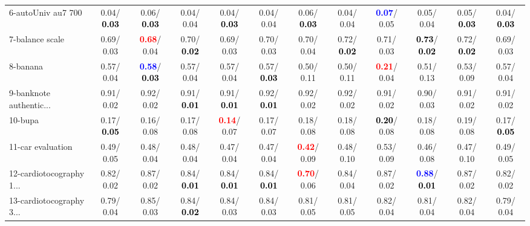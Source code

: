 \begin{table}[h]
\begin{center}
{\begin{tabular}{lc|c|c|c|c|c|c|c|c|c|c}
6-autoUniv au7 700 &   0.04/\textcolor{black}{\textbf{  0.03}} &   0.06/\textcolor{black}{\textbf{  0.03}} &   0.04/  0.04 &   0.04/\textcolor{black}{\textbf{  0.03}} &   0.04/  0.04 &   0.06/\textcolor{black}{\textbf{  0.03}} &   0.04/  0.04 & \textcolor{blue}{\textbf{  0.07}}/  0.05 &   0.05/  0.04 &   0.05/\textcolor{black}{\textbf{  0.03}} &   0.04/\textcolor{black}{\textbf{  0.03}} \\
7-balance scale &   0.69/  0.03 & \textcolor{red}{\textbf{  0.68}}/  0.04 &   0.70/\textcolor{black}{\textbf{  0.02}} &   0.69/  0.03 &   0.70/  0.03 &   0.70/  0.04 &   0.72/\textcolor{black}{\textbf{  0.02}} &   0.71/  0.03 & \textcolor{black}{\textbf{  0.73}}/\textcolor{black}{\textbf{  0.02}} &   0.72/\textcolor{black}{\textbf{  0.02}} &   0.69/  0.03 \\ \hline
8-banana &   0.57/  0.04 & \textcolor{blue}{\textbf{  0.58}}/\textcolor{black}{\textbf{  0.03}} &   0.57/  0.04 &   0.57/  0.04 &   0.57/\textcolor{black}{\textbf{  0.03}} &   0.50/  0.11 &   0.50/  0.11 & \textcolor{red}{\textbf{  0.21}}/  0.04 &   0.51/  0.13 &   0.53/  0.09 &   0.57/  0.04 \\
9-banknote authentic... &   0.91/  0.02 &   0.92/  0.02 &   0.91/\textcolor{black}{\textbf{  0.01}} &   0.91/\textcolor{black}{\textbf{  0.01}} &   0.92/\textcolor{black}{\textbf{  0.01}} &   0.92/  0.02 &   0.92/  0.02 &   0.91/  0.02 &   0.90/  0.03 &   0.91/  0.02 &   0.91/  0.02 \\
10-bupa &   0.17/\textcolor{black}{\textbf{  0.05}} &   0.16/  0.08 &   0.17/  0.08 & \textcolor{red}{\textbf{  0.14}}/  0.07 &   0.17/  0.07 &   0.18/  0.08 &   0.18/  0.08 & \textcolor{black}{\textbf{  0.20}}/  0.08 &   0.18/  0.08 &   0.19/  0.08 &   0.17/\textcolor{black}{\textbf{  0.05}} \\
11-car evaluation &   0.49/  0.05 &   0.48/  0.04 &   0.48/  0.04 &   0.47/  0.04 &   0.47/  0.04 & \textcolor{red}{\textbf{  0.42}}/  0.09 &   0.48/  0.10 &   0.53/  0.09 &   0.46/  0.08 &   0.47/  0.10 &   0.49/  0.05 \\
12-cardiotocography 1... &   0.82/  0.02 &   0.87/  0.02 &   0.84/\textcolor{black}{\textbf{  0.01}} &   0.84/\textcolor{black}{\textbf{  0.01}} &   0.84/\textcolor{black}{\textbf{  0.01}} & \textcolor{red}{\textbf{  0.70}}/  0.06 &   0.84/  0.04 &   0.87/  0.02 & \textcolor{blue}{\textbf{  0.88}}/\textcolor{black}{\textbf{  0.01}} &   0.87/  0.02 &   0.82/  0.02 \\
13-cardiotocography 3... &   0.79/  0.04 &   0.85/  0.03 &   0.84/\textcolor{black}{\textbf{  0.02}} &   0.84/  0.03 &   0.84/  0.03 &   0.81/  0.05 &   0.81/  0.05 &   0.82/  0.04 &   0.81/  0.04 &   0.82/  0.04 &   0.79/  0.04 \\

\end{tabular}}
\end{center}
\end{table}
